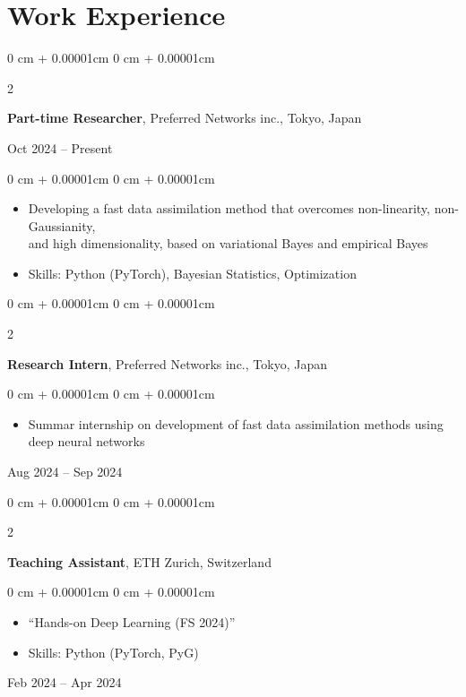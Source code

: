 \documentclass[11pt, letterpaper]{article}
\newenvironment{highlights}{
    \begin{itemize}[
        topsep=0.0cm,
        parsep=0.0cm,
        partopsep=0pt,
        itemsep=0pt,
        leftmargin=10pt
    ]
}{
    \end{itemize}
} %
\newenvironment{onecolentry}{
    \begin{adjustwidth}{
        0 cm + 0.00001cm
    }{
        0 cm + 0.00001cm
    }
}{
    \end{adjustwidth}
} %
\newenvironment{twocolentry}[2][]{
    \onecolentry
    \def\secondColumn{#2}
    \setcolumnwidth{\fill, 3.5cm}
    \begin{paracol}{2}
}{
    \switchcolumn \raggedleft \secondColumn
    \end{paracol}
    \endonecolentry
} %
\begin{document}
  \section{Work Experience}
    \begin{twocolentry}{Oct 2024 -- Present}
      \textbf{Part-time Researcher}, Preferred Networks inc., Tokyo, Japan
    \end{twocolentry}
    \vspace{0.10cm}
    \begin{onecolentry}
        \begin{highlights}
            \item Developing a fast data assimilation method that overcomes non-linearity, non-Gaussianity,\\and high dimensionality, based on variational Bayes and empirical Bayes
            \item Skills: Python (PyTorch), Bayesian Statistics, Optimization
        \end{highlights}
    \end{onecolentry}
    \vspace{0.25cm}
    \begin{twocolentry}{Aug 2024 -- Sep 2024}
      \textbf{Research Intern}, Preferred Networks inc., Tokyo, Japan
      \vspace{0.10 cm}
      \begin{onecolentry}
        \begin{highlights}
          \item Summar internship on development of fast data assimilation methods using deep neural networks
        \end{highlights}
      \end{onecolentry}
    \end{twocolentry}
    \vspace{0.25cm}
    \begin{twocolentry}{Feb 2024 -- Apr 2024}
      \textbf{Teaching Assistant}, ETH Zurich, Switzerland
      \vspace{0.10 cm}
      \begin{onecolentry}
        \begin{highlights}
          \item ``Hands-on Deep Learning (FS 2024)''
          \item Skills: Python (PyTorch, PyG)
        \end{highlights}
      \end{onecolentry}
    \end{twocolentry}
\end{document}
